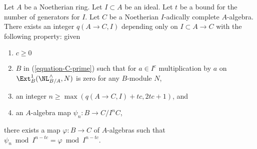 \begin{lemma}
\label{lemma-get-morphism-general-better}
Let $A$ be a Noetherian ring. Let $I \subset A$ be an ideal.
Let $t$ be a bound for the number of generators for $I$.
Let $C$ be a Noetherian $I$-adically complete $A$-algebra.
There exists an integer $q(A \to C, I)$ depending only on
$I \subset A \to C$ with the following property: given
\begin{enumerate}
\item $c \geq 0$
\item $B$ in (\ref{equation-C-prime}) such that for
$a \in I^c$ multiplication by $a$ on $\Ext^1_B(\NL^\wedge_{B/A}, N)$
is zero for any $B$-module $N$,
\item an integer $n \geq \max(q(A \to C, I) + tc, 2tc + 1)$, and
\item an $A$-algebra map $\psi_n : B \to C/I^nC$,
\end{enumerate}
there exists a map $\varphi : B \to C$ of $A$-algebras such
that $\psi_n \bmod I^{n - tc} = \varphi \bmod I^{n - tc}$.
\end{lemma}

